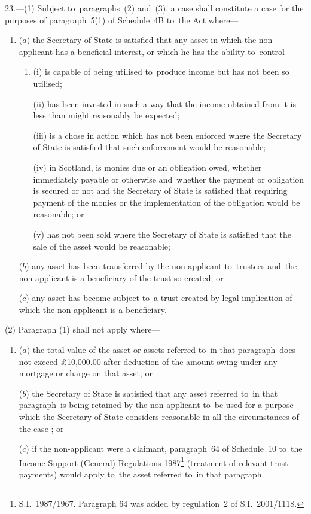 \documentclass[12pt,a4paper]{article}
\begin{document}
23.—(1)
Subject to~paragraphs~(2) and~(3), a case shall constitute a case for the
purposes of paragraph~5(1) of Schedule~4B to~the Act where—
\begin{enumerate}\item[]
($a$) the Secretary of State is satisfied that any asset in which the non-applicant
has a beneficial interest, or which he has the ability to~control—
\begin{enumerate}\item[]
(i) is capable of being utilised to~produce income but has not been so utilised;

(ii) has been invested in such a way that the income obtained from it is less
than might reasonably be expected;

(iii) is a chose in action which has not been enforced where the Secretary of
State is satisfied that such enforcement would be reasonable;

(iv) in Scotland, is monies due or an obligation owed, whether immediately
payable or otherwise and~whether the payment or obligation is secured or not and
the Secretary of State is satisfied that requiring payment of the monies or the
implementation of the obligation would be reasonable; or

(v) has not been sold where the Secretary of State is satisfied that the sale of
the asset would be reasonable;
\end{enumerate}

($b$) any asset has been transferred by the non-applicant to~trustees and~the
non-applicant is a beneficiary of the trust so created; or

($c$) any asset has become subject to~a trust created by legal implication of which
the non-applicant is a beneficiary.
\end{enumerate}

(2) Paragraph (1) shall not apply where—
\begin{enumerate}\item[]
($a$) the total value of the asset or assets referred to~in that paragraph~does not
exceed £10,000.00 after deduction of the amount owing under any mortgage or
charge on that asset; or

($b$) the Secretary of State is satisfied that any asset referred to~in that
paragraph~is being retained by the non-applicant to~be used for a purpose which
the Secretary of State considers reasonable in all the circumstances of the
case%
%
; or

    ($c$) 
    if the non-applicant were a claimant, paragraph~64 of Schedule~10 to~the Income Support (General) Regulations 1987\footnote{S.I.\ 1987/1967. Paragraph 64 was added by regulation~2 of S.I.\ 2001/1118.} (treatment of relevant trust payments) would apply to~the asset referred to~in that paragraph.
\end{enumerate}
\end{document}
